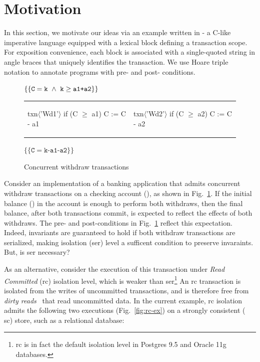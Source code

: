 \section{Motivation}
\label{sec:motivation}

In this section, we motivate our ideas via an example written in
\txnimp - a C-like imperative language equipped with a  lexical
block defining a transaction scope.  For exposition convenience, each
 block is associated with a single-quoted string in angle
braces that uniquely identifies the transaction. We use Hoare triple
notation to annotate programs with pre- and post- conditions.

\begin{figure}
\centering
$\{\{\texttt{C}=\texttt{k} ~\wedge~ \texttt{k}\ge\texttt{a1+a2}\}\}$
\begin{tabular}{l||l}
\begin{txnimpcode}
  txn$\langle$'Wd1'$\rangle${
    if (C $\ge$ a1) {
      C := C - a1
    }
  }
\end{txnimpcode}
&
\begin{txnimpcode}
  txn$\langle$'Wd2'$\rangle${
    if (C $\ge$ a2) {
      C := C - a2
    }
  }
\end{txnimpcode}
\\
\end{tabular}
$\{\{\texttt{C}=\texttt{k-a1-a2}\}\}$

\caption{Concurrent withdraw transactions}
\label{fig:motiv-eg-1}
\end{figure}

Consider an implementation of a banking application that admits
concurrent withdraw transactions on a checking account (), as
shown in Fig.~\ref{fig:motiv-eg-1}. If the initial balance () in
the account is enough to perform both withdraws, then the final
balance, after both transactions commit, is expected to reflect the
effects of both withdraws. The pre- and post-conditions in
Fig.~\ref{fig:motiv-eg-1} reflect this expectation. Indeed, invariants
are guaranteed to hold if both withdraw transactions are serialized,
making  isolation ({\sc ser}) level a sufficent
condition to preserve invaraints. But, is {\sc ser} necessary?

As an alternative, consider the execution of this transaction under
\emph{Read Committed} ({\sc rc}) isolation level, which is weaker than
{\sc ser}\footnote{{\sc rc} is in fact the default isolation level in
Postgres 9.5 and Oracle 11g databases.} An {\sc rc} transaction is
isolated from the writes of uncommitted transactions, and is therefore
free from \emph{dirty reads}~\cite{berenson} that read uncommitted
data. In the current example, {\sc rc} isolation admits the following
two executions (Fig.~\ref{fig:rc-ex}) on a strongly consistent ({\sc
sc}) store, such as a relational database:

